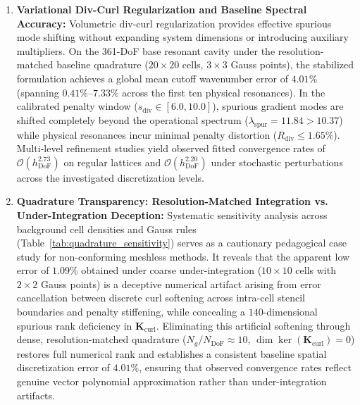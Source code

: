 \documentclass[preprint,12pt]{elsarticle}
\begin{document}
\begin{enumerate}
    \item \textbf{Variational Div-Curl Regularization and Baseline Spectral Accuracy:}
          Volumetric div-curl regularization provides effective spurious mode shifting without expanding system dimensions or introducing auxiliary multipliers. On the 361-DoF base resonant cavity under the resolution-matched baseline quadrature ($20 \times 20$ cells, $3 \times 3$ Gauss points), the stabilized formulation achieves a global mean cutoff wavenumber error of $4.01\%$ (spanning $0.41\%\text{--}7.33\%$ across the first ten physical resonances). In the calibrated penalty window ($s_{\mathrm{div}} \in [6.0, 10.0]$), spurious gradient modes are shifted completely beyond the operational spectrum ($\lambda_{\mathrm{spur}} = 11.84 > 10.37$) while physical resonances incur minimal penalty distortion ($R_{\mathrm{div}} \le 1.65\%$). Multi-level refinement studies yield observed fitted convergence rates of $\mathcal{O}(h_{\mathrm{DoF}}^{2.73})$ on regular lattices and $\mathcal{O}(h_{\mathrm{DoF}}^{2.20})$ under stochastic perturbations across the investigated discretization levels.

    \item \textbf{Quadrature Transparency: Resolution-Matched Integration vs. Under-Integration Deception:}
          Systematic sensitivity analysis across background cell densities and Gauss rules (Table~\ref{tab:quadrature_sensitivity}) serves as a cautionary pedagogical case study for non-conforming meshless methods. It reveals that the apparent low error of $1.09\%$ obtained under coarse under-integration ($10 \times 10$ cells with $2 \times 2$ Gauss points) is a deceptive numerical artifact arising from error cancellation between discrete curl softening across intra-cell stencil boundaries and penalty stiffening, while concealing a $140$-dimensional spurious rank deficiency in $\mathbf{K}_{\mathrm{curl}}$. Eliminating this artificial softening through dense, resolution-matched quadrature ($N_g / N_{\mathrm{DoF}} \approx 10$, $\dim\ker(\mathbf{K}_{\mathrm{curl}}) = 0$) restores full numerical rank and establishes a consistent baseline spatial discretization error of $4.01\%$, ensuring that observed convergence rates reflect genuine vector polynomial approximation rather than under-integration artifacts.


\end{enumerate}
\end{document}
